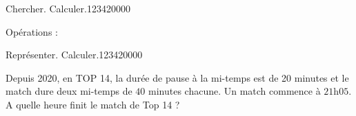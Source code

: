 \begin{pageParcoursd}
\begin{ExoCd}{ Chercher. Calculer.}{1234}{2}{0}{0}{0}{0}
\begin{minipage}{0.5\linewidth}
 \end{minipage}
\begin{minipage}{0.5\linewidth}
 
  Opérations :
  \vspace{5cm}
  
  
\end{minipage}
 


\end{ExoCd}

\begin{ExoCd}{ Représenter. Calculer.}{1234}{2}{0}{0}{0}{0}
 


Depuis 2020, en TOP 14, la durée de pause à la mi-temps est de 20 minutes et le match dure deux mi-temps de $40$ minutes chacune. Un match commence à $21$h$05$.  A quelle heure finit le match de Top 14 ? 


\end{ExoCd}

 
 
 
\end{pageParcoursd}
